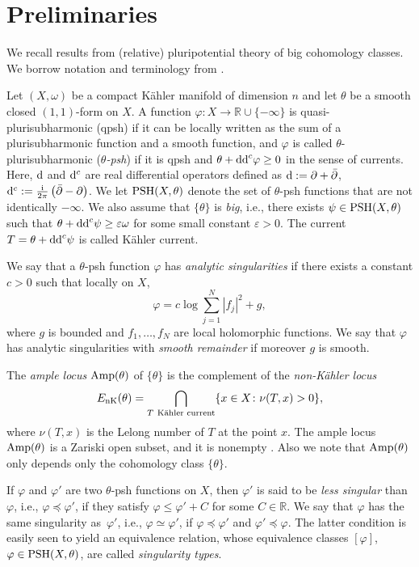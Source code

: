 \documentclass[11pt]{article}
\numberwithin{equation}{section}
\numberwithin{equation}{section}
\theoremstyle{plain}
\newcommand{\vep}{\varepsilon}
\newcommand \psh {{\rm PSH}}
\newcommand \Amp {{\rm Amp}}
\begin{document}
\section{Preliminaries}\label{sec:prelim}

We recall results from (relative) pluripotential theory of big cohomology classes. We borrow notation and terminology from \cite{DDL6}.

Let $(X,\omega)$ be a compact K\"ahler manifold of dimension $n$ and let $\theta$ be a smooth closed $(1,1)$-form on $X$. A function $\varphi\colon X\rightarrow \mathbb{R}\cup\{-\infty\}$ is quasi-plurisubharmonic (qpsh) if it can be locally written as the sum of a plurisubharmonic function and a smooth function, and $\varphi$ is called $\theta$-plurisubharmonic ($\theta$\emph{-psh}) if it is qpsh and $\theta+{\rm dd}^c \varphi\geq 0$ in the sense of currents. Here, ${\rm d}$ and ${\rm d}^c$ are real differential operators defined as ${\rm d}:=\partial +\bar{\partial}$, ${\rm d}^c:=\frac{\rm i}{2\pi}\left(\bar{\partial}-\partial \right)$. We let $\psh(X,\theta)$ denote the set of $\theta$-psh functions that are not identically $-\infty$.
We also assume that $\{\theta\}$ is \emph{big}, i.e., there exists $\psi \in {\rm PSH}(X,\theta)$ such that $\theta +{\rm dd}^c \psi \geq \vep \omega$ for some small constant $\vep>0$. The current $T=\theta+{\rm dd}^c\psi$ is called K\"ahler current.

We say that a $\theta$-psh function $\varphi$ has \emph{analytic singularities} if there exists a constant $c>0$ such that locally on $X$,
\[
\varphi={c}\log\sum_{j=1}^{N}|f_j|^2+g,
\]
where $g$ is bounded and $f_1,\dots,f_N$ are local holomorphic functions.
We say that $\varphi$ has analytic singularities with \emph{smooth remainder} if moreover $g$ is smooth.

The \emph{ample locus} $\Amp(\theta)$ of $\{\theta\}$ is the complement of the \emph{non-K\"ahler locus}
\[E_{\rm nK}(\theta)= \bigcap_{T \ {\text{K\"ahler current}}} \{x\in X \colon \nu(T,x)>0 \},\]
where $\nu(T,x)$ is the Lelong number of $T$ at the point $x$.
The ample locus $\Amp(\theta)$ is a Zariski open subset, and it is nonempty \cite{Bou04}. Also we note that $\Amp(\theta)$ only depends only the cohomology class $\{ \theta\}$.

If $\varphi$ and $\varphi'$ are two $\theta$-psh functions on $X$, then $\varphi'$ is said to be \emph{less singular} than $\varphi$, i.e., $\varphi \preceq \varphi'$, if they satisfy $\varphi\le\varphi'+C$ for some $C\in \mathbb{R}$.
We say that $\varphi$ has the same singularity as~$\varphi'$, i.e., $\varphi \simeq \varphi'$, if $\varphi \preceq \varphi'$ and $\varphi' \preceq \varphi$. The latter condition is easily seen to yield an equivalence relation, whose equivalence classes $[\varphi]$, $\varphi \in \psh(X, \theta)$, are called \emph{singularity types}.
\end{document}
